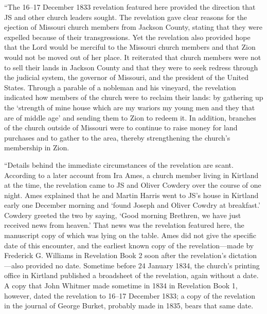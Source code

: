 			``The 16--17 December 1833 revelation featured here provided the direction that JS and other church leaders sought. The revelation gave clear reasons for the ejection of Missouri church members from Jackson County, stating that they were expelled because of their transgressions. Yet the revelation also provided hope that the Lord would be merciful to the Missouri church members and that Zion would not be moved out of her place. It reiterated that church members were not to sell their lands in Jackson County and that they were to seek redress through the judicial system, the governor of Missouri, and the president of the United States. Through a parable of a nobleman and his vineyard, the revelation indicated how members of the church were to reclaim their lands: by gathering up the `strength of mine house which are my wariors my young men and they that are of middle age' and sending them to Zion to redeem it. In addition, branches of the church outside of Missouri were to continue to raise money for land purchases and to gather to the area, thereby strengthening the church's membership in Zion.
			
			``Details behind the immediate circumstances of the revelation are scant. According to a later account from Ira Ames, a church member living in Kirtland at the time, the revelation came to JS and Oliver Cowdery over the course of one night. Ames explained that he and Martin Harris went to JS's house in Kirtland early one December morning and `found Joseph and Oliver Cowdry at breakfast.' Cowdery greeted the two by saying, `Good morning Brethren, we have just received news from heaven.' That news was the revelation featured here, the manuscript copy of which was lying on the table. Ames did not give the specific date of this encounter, and the earliest known copy of the revelation---made by Frederick G. Williams in Revelation Book 2 soon after the revelation's dictation---also provided no date. Sometime before 24 January 1834, the church's printing office in Kirtland published a broadsheet of the revelation, again without a date. A copy that John Whitmer made sometime in 1834 in Revelation Book 1, however, dated the revelation to 16--17 December 1833; a copy of the revelation in the journal of George Burket, probably made in 1835, bears that same date.
			
